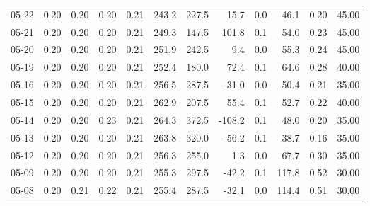 \begin{threeparttable}
{\begin{tabular}{lrrrrrrrrrrr}
  05-22 &          0.20 &          0.20 &          0.20 &        0.21 &               243.2 &               227.5 &       15.7 &                 0.0 &             46.1 &            0.20 &                  45.00 \\
  05-21 &          0.20 &          0.20 &          0.20 &        0.21 &               249.3 &               147.5 &      101.8 &                 0.1 &             54.0 &            0.23 &                  45.00 \\
  05-20 &          0.20 &          0.20 &          0.20 &        0.21 &               251.9 &               242.5 &        9.4 &                 0.0 &             55.3 &            0.24 &                  45.00 \\
  05-19 &          0.20 &          0.20 &          0.20 &        0.21 &               252.4 &               180.0 &       72.4 &                 0.1 &             64.6 &            0.28 &                  40.00 \\
  05-16 &          0.20 &          0.20 &          0.20 &        0.21 &               256.5 &               287.5 &      -31.0 &                 0.0 &             50.4 &            0.21 &                  35.00 \\
  05-15 &          0.20 &          0.20 &          0.20 &        0.21 &               262.9 &               207.5 &       55.4 &                 0.1 &             52.7 &            0.22 &                  40.00 \\
  05-14 &          0.20 &          0.20 &          0.23 &        0.21 &               264.3 &               372.5 &     -108.2 &                 0.1 &             48.0 &            0.20 &                  35.00 \\
  05-13 &          0.20 &          0.20 &          0.20 &        0.21 &               263.8 &               320.0 &      -56.2 &                 0.1 &             38.7 &            0.16 &                  35.00 \\
  05-12 &          0.20 &          0.20 &          0.20 &        0.21 &               256.3 &               255.0 &        1.3 &                 0.0 &             67.7 &            0.30 &                  35.00 \\
  05-09 &          0.20 &          0.20 &          0.20 &        0.21 &               255.3 &               297.5 &      -42.2 &                 0.1 &            117.8 &            0.52 &                  30.00 \\
  05-08 &          0.20 &          0.21 &          0.22 &        0.21 &               255.4 &               287.5 &      -32.1 &                 0.0 &            114.4 &            0.51 &                  30.00 \\

\end{tabular}}
\end{threeparttable}
